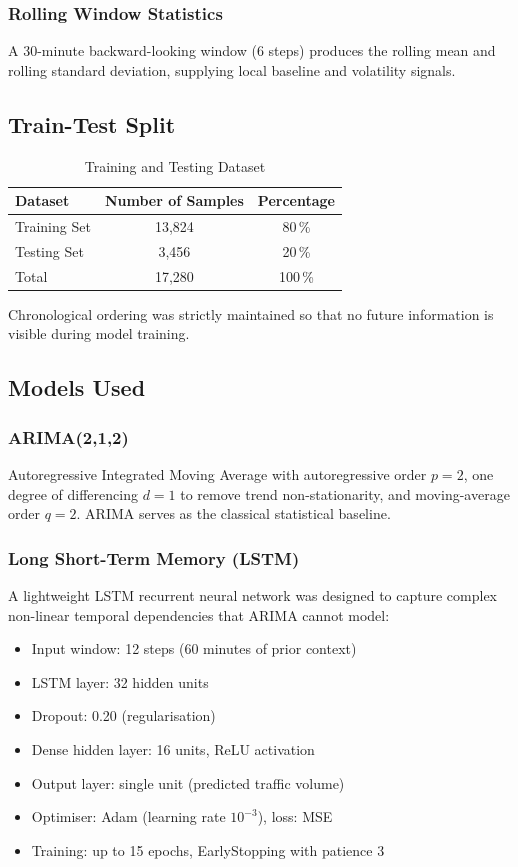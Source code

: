 \documentclass[12pt,a4paper]{article}
\begin{document}
\subsubsection{Rolling Window Statistics}
A 30-minute backward-looking window (6 steps) produces the rolling mean and rolling
standard deviation, supplying local baseline and volatility signals.

\subsection{Train-Test Split}

\begin{table}[H]
  \centering
  \caption{Training and Testing Dataset}
  \label{tab:split}
  \renewcommand{\arraystretch}{1.3}
  \begin{tabular}{lcc}
    \toprule
    \textbf{Dataset} & \textbf{Number of Samples} & \textbf{Percentage} \\
    \midrule
    Training Set & 13,824 & 80\,\% \\
    Testing Set  & 3,456  & 20\,\% \\
    Total        & 17,280 & 100\,\% \\
    \bottomrule
  \end{tabular}
\end{table}

Chronological ordering was strictly maintained so that no future information is visible
during model training.

\subsection{Models Used}

\subsubsection{ARIMA(2,1,2)}
Autoregressive Integrated Moving Average with autoregressive order $p=2$, one
degree of differencing $d=1$ to remove trend non-stationarity, and moving-average
order $q=2$.  ARIMA serves as the classical statistical baseline.

\subsubsection{Long Short-Term Memory (LSTM)}
A lightweight LSTM recurrent neural network was designed to capture complex
non-linear temporal dependencies that ARIMA cannot model:
\begin{itemize}
  \item Input window: 12 steps (60 minutes of prior context)
  \item LSTM layer: 32 hidden units
  \item Dropout: 0.20 (regularisation)
  \item Dense hidden layer: 16 units, ReLU activation
  \item Output layer: single unit (predicted traffic volume)
  \item Optimiser: Adam (learning rate $10^{-3}$), loss: MSE
  \item Training: up to 15 epochs, EarlyStopping with patience 3
\end{itemize}
\end{document}
